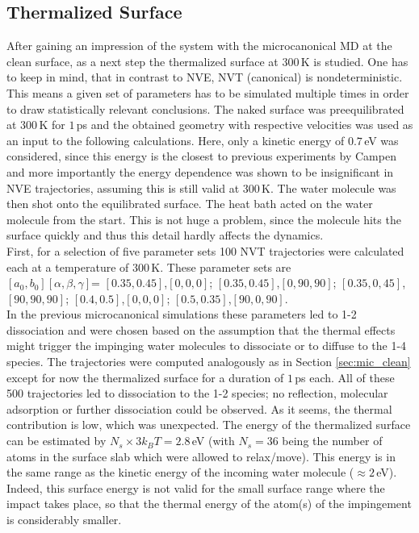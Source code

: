 \documentclass[11pt,DIV=13,BCOR=5mm,a4paper,headinclude]{scrbook}
\begin{document}
\subsection{Thermalized Surface}\label{therm_surf}
After gaining an impression of the system with the microcanonical MD at the clean surface, as a next step the thermalized surface at $300\,$K is studied.
One has to keep in mind, that in contrast to NVE, NVT (canonical) is nondeterministic.
This means a given set of parameters has to be simulated multiple times in order to draw statistically relevant conclusions.
The naked surface was preequilibrated at $300\,$K for $1\,$ps and the obtained geometry with respective velocities was used as an input to the following calculations.
Here, only a kinetic energy of $0.7\,$eV was considered, since this energy is the closest to previous experiments by Campen and more importantly the energy dependence was shown to be insignificant in NVE trajectories, assuming this is still valid at $300\,$K.
The water molecule was then shot onto the equilibrated surface.
The heat bath acted on the water molecule from the start.
This is not huge a problem, since the molecule hits the surface quickly and thus this detail hardly affects the dynamics.
\\
First, for a selection of five parameter sets 100 NVT trajectories were calculated each at a temperature of $300\,$K.
These parameter sets are\\ $[a_0,b_0][\alpha,\beta,\gamma]$= $[0.35,0.45]$,$[0,0,0]$; $[0.35,0.45]$,$[0,90,90]$; $[0.35,0,45]$,$[90,90,90]$; $[0.4,0.5]$,$[0,0,0]$;  $[0.5,0.35]$,$[90,0,90]$.\\
In the previous microcanonical simulations these parameters led to 1-2 dissociation and were chosen based on the assumption that the thermal effects might trigger the impinging water molecules to dissociate or to diffuse to the 1-4 species.
The trajectories were computed analogously as in Section \ref{sec:mic_clean} except for now the thermalized surface for a duration of $1\,$ps each.
All of these 500 trajectories led to dissociation to the 1-2 species; no reflection, molecular adsorption or further dissociation could be observed.
As it seems, the thermal contribution is low, which was unexpected.
The energy of the thermalized surface can be estimated by $N_s\times 3k_BT=2.8\,$eV (with $N_s=36$ being the number of atoms in the surface slab which were allowed to relax/move).
This energy is in the same range as the kinetic energy of the incoming water molecule ($\approx2\,$eV).
Indeed, this surface energy is not valid for the small surface range where the impact takes place, so that the thermal energy of the atom(s) of the impingement is considerably smaller.
\end{document}
